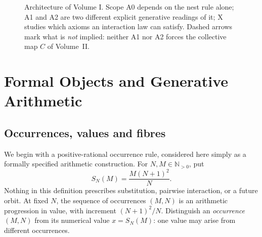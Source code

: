 \documentclass[11pt,oneside,openany]{book}
\theoremstyle{definition}
\theoremstyle{remark}
\newcommand{\N}{\mathbb{N}}
\begin{document}
\begin{figure}[t]
\centering
{}
\caption{Architecture of Volume I. Scope \textsf{A0} depends on the nest rule alone; \textsf{A1} and \textsf{A2} are two different explicit generative readings of it; \textsf{X} studies which axioms an interaction law can satisfy. Dashed arrows mark what is \emph{not} implied: neither \textsf{A1} nor \textsf{A2} forces the collective map $C$ of Volume~II.}
\end{figure}
\tableofcontents
\mainmatter

\chapter{Formal Objects and Generative Arithmetic}
\label{ch:objects}
\section{Occurrences, values and fibres}
We begin with a positive-rational occurrence rule, considered here simply as a formally specified arithmetic construction. For \(N,M\in\N_{>0}\), put
\begin{equation}\label{eq:base}
 S_N(M)=\frac{M(N+1)^2}{N}.
\end{equation}
Nothing in this definition prescribes substitution, pairwise interaction, or a future orbit. At fixed \(N\), the sequence of occurrences \((M,N)\) is an arithmetic progression in value, with increment \((N+1)^2/N\). Distinguish an \emph{occurrence} \((M,N)\) from its numerical value \(x=S_N(M)\): one value may arise from different occurrences.
\end{document}
